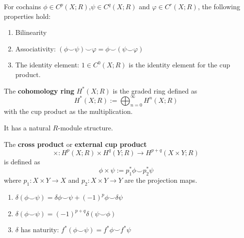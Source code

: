 \documentclass[12pt, oneside]{book}
\begin{document}
\begin{lemma}
    For cochains $\phi \in C^p(X;R)$,$\psi \in C^q(X;R)$ and $\varphi \in C^r(X;R)$, the following properties hold:
    \begin{enumerate}
        \item Bilinearity
        \item Associativity: $(\phi \smile \psi) \smile \varphi = \phi \smile (\psi \smile \varphi)$
        \item The identity element: $1 \in C^0(X;R)$ is the identity element for the cup product.
    \end{enumerate}
\end{lemma}


\begin{definition}
    The \textbf{cohomology ring} $H^*(X;R)$ is the graded ring defined as
    \begin{equation*}
        H^*(X;R) := \bigoplus_{n=0}^{\infty} H^n(X;R)
    \end{equation*}
    with the cup product as the multiplication.
    \begin{remark}
        It has a natural $R$-module structure.
    \end{remark}
\end{definition}



\begin{definition}
    The \textbf{cross product} or \textbf{external cup product}
    \begin{equation*}
        \times: H^p(X;R) \times H^q(Y;R) \longrightarrow H^{p+q}(X\times Y;R)
    \end{equation*}
    is defined as
    \begin{equation*}
        \phi \times \psi := p_1^*\phi \smile p_2^*\psi
    \end{equation*}
    where $p_1: X\times Y \to X$ and $p_2: X\times Y \to Y$ are the projection maps.
\end{definition}






\begin{proposition}
    \begin{enumerate}
        \item $\delta (\phi \smile \psi) = \delta \phi \smile \psi + (-1)^p \phi \smile \delta \psi$
        \item $\delta (\phi \smile \psi) = (-1)^{p+q} \delta (\psi\smile \phi )$
        \item $\delta$ has naturity: $f^*(\phi \smile \psi) = f^*\phi \smile f^*\psi$
    \end{enumerate}
\end{proposition}
\end{document}
